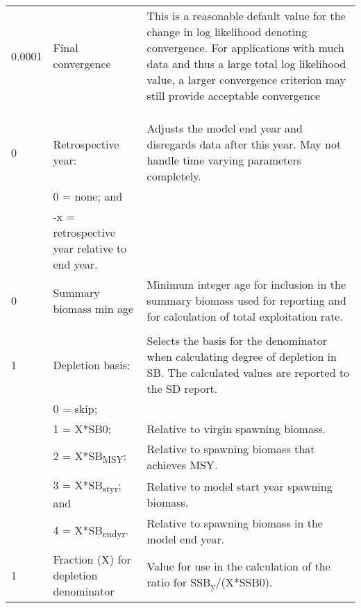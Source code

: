 {\begin{landscape}
\begin{longtable}{p{1.5cm} p{7.2cm} p{12.3cm}}
 
 \hline
 0.0001 & Final convergence & \multirow{1}{1cm}[-0.25cm]{\parbox{12.5cm}{This is a reasonable default value for the change in log likelihood denoting convergence.  For applications with much data and thus a large total log likelihood value, a larger convergence criterion may still provide acceptable convergence}}\Tstrut\\
        & & \\
        & & \\
		& & \\ 
 
 \hline
 0 & Retrospective year: & \multirow{1}{1cm}[-0.25cm]{\parbox{12.5cm}{Adjusts the model end year and disregards data after this year.  May not handle time varying parameters completely.}} \Tstrut\\
   & 0 = none; and & \\
   & -x = retrospective year relative to end year. & \\
  
 \hline
 0 & Summary biomass min age & \multirow{1}{1cm}[-0.25cm]{\parbox{12.5cm}{Minimum integer age for inclusion in the summary biomass used for reporting and for calculation of total exploitation rate.}}\Tstrut\\
   & & \\ 

 \hline
 1 & Depletion basis: & \multirow{1}{1cm}[-0.25cm]{\parbox{12.5cm}{Selects the basis for the denominator when calculating degree of depletion in SB.  The calculated values are reported to the SD report.}}\Tstrut\\
   & 0 = skip; & \\
   & 1 = X*SB0; & Relative to virgin spawning biomass.\\
   & 2 = X*SB\textsubscript{MSY}; & Relative to spawning biomass that achieves MSY.\\
   & 3 = X*SB\textsubscript{styr}; and & Relative to model start year spawning biomass.\\
   & 4 = X*SB\textsubscript{endyr}. & Relative to spawning biomass in the model end year.\\
  
 \hline
 1 & Fraction (X) for depletion denominator & Value for use in the calculation of the ratio for SSB\textsubscript{y}/(X*SSB0).\Tstrut\\


\end{longtable}
\end{landscape}}

